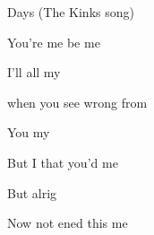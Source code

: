 \begin{SBSong}{Days (The Kinks song)}
\begin{SBVerse}
	  You're  me    be me  
    \end{SBVerse}
  \fi
  \begin{SBVerse}
 	 I'll  all my 

 	 when you  see wrong from 

	You  my 

	But  I  that   you'd  me 

	But  alrig

    Now  not ened	 this   me 
  \end{SBVerse} 
\end{SBSong}

